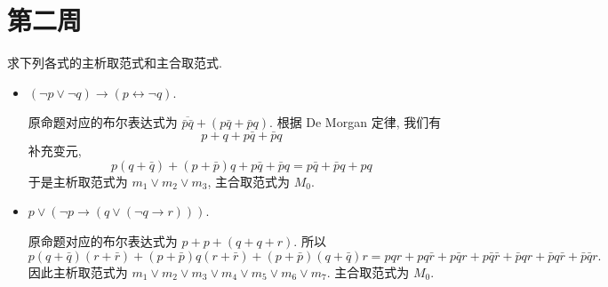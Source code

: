 \documentclass[10pt,UTF8]{book} %
\begin{document}
\section{第二周}

\begin{example}
    求下列各式的主析取范式和主合取范式.
    \begin{itemize}[itemsep=0pt]
        \item $(\lnot p \vee \lnot q) \to (p \leftrightarrow \lnot q)$.
        \begin{sol}
            原命题对应的布尔表达式为 $\overline{\bar p \bar q} + \left(
                p\bar q + \bar p q
            \right)$. 根据 De Morgan 定律, 我们有
            \[ p+q + p \bar q + \bar p q \]
            补充变元,
            \[ p(q +\bar q) + (p + \bar p)q + p \bar q + \bar p q = p\bar q + \bar pq + pq \]
            于是主析取范式为 $m_1 \vee m_2 \vee m_3$, 主合取范式为 $M_0$.
        \end{sol}
        \item $p \vee (\lnot p \to (q \vee (\lnot q \to r)))$.
        \begin{sol}
            原命题对应的布尔表达式为 $p+p+(q + q + r)$. 所以
            \[ p(q + \bar q)(r + \bar r) + (p + \bar p)q(r+ \bar r) + (p +\bar p)(q + \bar q)r =
            pqr + pq \bar r + p \bar q r + p \bar q \bar r + \bar p qr + \bar p q \bar r + \bar p \bar q r. \]
            因此主析取范式为 $m_1 \vee m_2 \vee m_3 \vee m_4 \vee m_5 \vee m_6 \vee m_7$.
            主合取范式为 $M_0$.
        \end{sol}
    \end{itemize}
\end{example}
\end{document}
